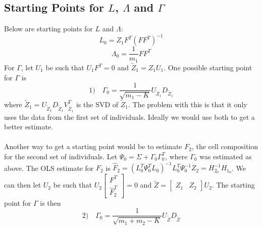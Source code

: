 \documentclass{article}
\begin{document}
\subsection{Starting Points for $L$, $\Lambda$ and $\Gamma$}
Below are starting points for $L$ and $\Lambda$:
\[
L_0 = Z_1 F^T \left( FF^T \right)^{-1}
\]
\[
\Lambda_0 = \frac{1}{m_1} FF^T
\]
For $\Gamma$, let $U_1$ be such that $U_1 F^T = 0$ and $\tilde{Z}_1 = Z_1 U_1$. One possible starting point for 
$\Gamma$ is
\[
1) \quad\Gamma_0 = \frac{1}{\sqrt{m_1 - K}} U_{\tilde{Z}_1} D_{\tilde{Z}_1}
\]
where ${\tilde{Z}_1} = U_{\tilde{Z}_1} D_{\tilde{Z}_1} V^T_{\tilde{Z}_1}$ is the SVD of ${\tilde{Z}_1}$. The problem with this is that it only uses the data from the first set of individuals. Ideally we would use both to get a better estimate.\\
\\
Another way to get a starting point would be to estimate $F_2$, the cell composition for the second set of individuals. Let $\Psi_0 = \Sigma + \Gamma_0 \Gamma_0^T$, where $\Gamma_0$ was estimated as above. The OLS estimate for $F_2$ is $\hat{F}_2 = \left( L_0^T \Psi_0^T L_0 \right)^{-1} L_0^T \Psi_0^{-1} Z_2 = H_{2_0}^{-1} H_{1_0}$. We can then let $U_2$ be such that $U_2 \left[ \begin{matrix}
F^T\\
\hat{F}_2^T
\end{matrix} \right] = 0$ and $\tilde{Z} = \left[ \begin{matrix}
Z_1 & Z_2
\end{matrix} \right] U_2$. The starting point for $\Gamma$ is then
\[
2) \quad \Gamma_0 = \frac{1}{\sqrt{m_1 + m_2 - K}} U_{\tilde{Z}} D_{\tilde{Z}}
\]
\end{document}
